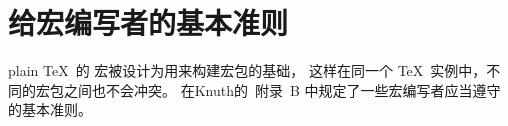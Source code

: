 \documentclass{book}
\begin{document}

\section{给宏编写者的基本准则}

plain \TeX\ 的  宏被设计为用来构建宏包的基础，
这样在同一个 \TeX\ 实例中，不同的宏包之间也不会冲突。
在Knuth的\TeXbook\ 附录~B 中规定了一些宏编写者应当遵守的基本准则。
\end{document}
